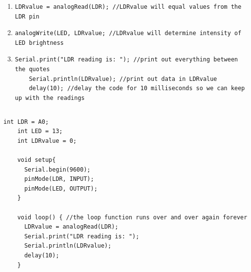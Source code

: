 \documentclass[]{bilingualworkshop}
\begin{document}
\begin{enumerate}
    \item{
    
    \begin{lstlisting}[language=arduino,numbers=none]
    LDRvalue = analogRead(LDR); //LDRvalue will equal values from the LDR pin
    \end{lstlisting}
    
    }
    
    \item{
    
    \begin{lstlisting}[language=arduino,numbers=none]
    analogWrite(LED, LDRvalue; //LDRvalue will determine intensity of LED brightness
    \end{lstlisting}}
    
    \item{
    
    \begin{lstlisting}[language=arduino,numbers=none]
    Serial.print("LDR reading is: "); //print out everything between the quotes
    Serial.println(LDRvalue); //print out data in LDRvalue
    delay(10); //delay the code for 10 milliseconds so we can keep up with the readings
    \end{lstlisting}
    
    }
    
    \end{enumerate}
    
    \newpage
    
    \subsection*{%
    }
    
    \begin{lstlisting}[language=arduino,numbers=none]
    int LDR = A0;
    int LED = 13;
    int LDRvalue = 0;
    
    void setup{
      Serial.begin(9600);
      pinMode(LDR, INPUT);
      pinMode(LED, OUTPUT);
    }
    
    void loop() { //the loop function runs over and over again forever
      LDRvalue = analogRead(LDR);
      Serial.print("LDR reading is: ");
      Serial.println(LDRvalue);
      delay(10);
    }
    \end{lstlisting}
    
\end{document}
